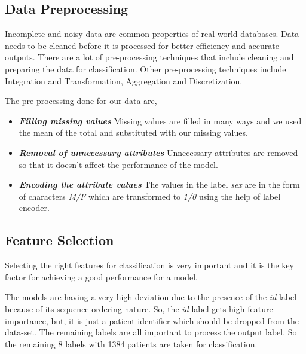 \documentclass[conference]{IEEEtran}
\begin{document}
\subsection{Data Preprocessing}
\label{ssec:preprocess}
Incomplete and noisy data are common properties of real world databases. Data needs to be cleaned before it is processed for better efficiency and accurate outputs. There are a lot of pre-processing techniques that include cleaning and preparing the data for classification. Other pre-processing techniques include Integration and Transformation, Aggregation and Discretization.

The pre-processing done for our data are,
\begin{itemize}
\item \textbf{\textit{Filling missing values}} Missing values are filled in many ways and we used the mean of the total and substituted with our missing values. 
\item \textbf{\textit{Removal of unnecessary attributes}} Unnecessary attributes are removed so that it doesn't affect the performance of the model.
\item \textbf{\textit{Encoding the attribute values}} The values in the label \textit{sex} are in the form of characters \textit{M/F} which are transformed to \textit{1/0} using the help of label encoder.
\end{itemize} 

\subsection{Feature Selection}
\label{ssec:featureselect}
Selecting the right features for classification is very important and it  is the key factor for achieving a good performance for a model. 
\par
The models are having a very high deviation due to the presence of the \textit{id} label because of its sequence ordering nature. So, the \textit{id} label gets high feature importance, but, it is just a patient identifier which should be dropped from the data-set. The remaining labels are all important to process the output label. So the remaining 8 labels with 1384 patients are taken for classification. 
\end{document}
